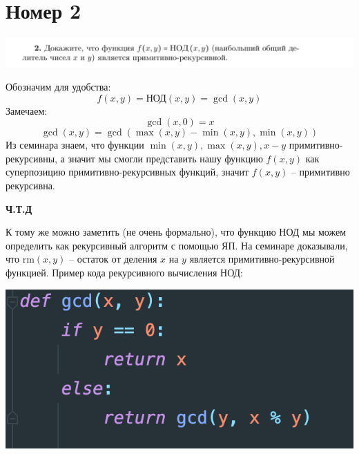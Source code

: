 \documentclass[a4paper,12pt]{article}
\begin{document}
\section*{Номер 2}
\begin{center}
\includegraphics[scale=0.4]{2.png}
\end{center}
Обозначим для удобства:
\[
f(x, y) = \text{НОД}(x, y) = \gcd(x, y) 
\]
Замечаем:
\[
\gcd(x, 0) = x
\]
\[
\gcd(x, y) = \gcd \left(
\max(x, y) - \min(x, y), \min(x, y)
\right)
\]
Из семинара знаем, что функции $\min(x, y), \max(x, y), x - y$ примитивно-рекурсивны, а значит мы смогли представить нашу функцию $f(x, y)$ как суперпозицию примитивно-рекурсивных функций, значит $f(x, y)$ -- примитивно рекурсивна.
\begin{center}
\textbf{Ч.Т.Д} 
\end{center}
К тому же можно заметить (не очень формально), что функцию НОД мы можем определить как рекурсивный алгоритм с помощью ЯП. На семинаре доказывали, что $\text{rm}(x, y)$ -- остаток от деления $x$ на $y$ является примитивно-рекурсивной функцией. Пример кода рекурсивного вычисления НОД:
\begin{center}
\includegraphics[scale=0.8]{5.png}
\end{center}
\clearpage
\end{document}
